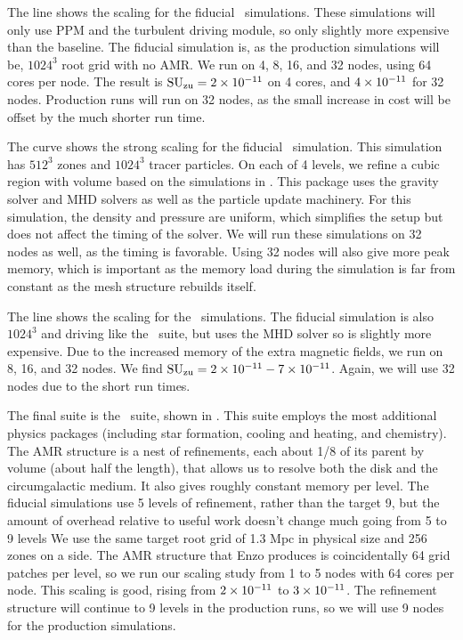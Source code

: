\documentclass[11pt]{NSF}  %
\begin{document}
The  line shows the scaling for the fiducial \nameTurbulence\
simulations.  These simulations will only use PPM and the turbulent driving
module, so only slightly more expensive than the baseline.  The
fiducial simulation is, as the production simulations will be, $1024^3$ root
grid with no AMR.
 We run on 4, 8, 16, and 32 nodes, using 64 cores per node.  The result is
$\rm{SU}_{\rm{zu}}=2\times {10^{-11}}$ on 4 cores, and $4\times {10^{-11}}$ for 32 nodes.  Production runs
will run on 32
nodes, as the small increase in cost will be offset by the much shorter run
time.

The  curve shows the strong scaling for the fiducial \nameCores\
simulation.  This simulation has $512^3$ zones and $1024^3$ tracer particles.
On each of 4 levels, we refine a cubic region with volume based on the simulations
in \citep{Collins12}.  This package uses the gravity solver and MHD solvers as
well as the particle update machinery.
For this simulation, the density and pressure are uniform, which simplifies the
setup but does not affect the timing of the solver.  We will run these
simulations on 32 nodes as well, as the timing is favorable. 
Using 32 nodes will also give more peak memory, which is important as the memory
load during the simulation is far from constant as the mesh structure rebuilds
itself.

The  line shows the scaling for the \nameCMB\ simulations. The fiducial
simulation is also $1024^3$ and driving like the \nameTurbulence\ suite, but uses the MHD solver so is slightly more
expensive.  Due to the increased memory of the extra magnetic fields, we run on
8, 16, and 32 nodes.  We find $\rm{SU}_{\rm{zu}}=2\times {10^{-11}}-7\times {10^{-11}}$.  
Again, we will use 32 nodes due to the short run times.

The final suite is the \nameGalaxies\ suite, shown in .  This suite
employs the most additional physics packages (including star formation,
cooling and heating, and chemistry).  The AMR structure
 is a nest of refinements, each about 1/8 of its
parent by volume (about half the length), that allows us to resolve both the disk and the circumgalactic medium.
It also gives roughly constant memory per level.
The fiducial simulations use 5 levels of refinement, rather than the target
9, but the amount of overhead relative to useful work doesn't change much going
from 5 to 9 levels  We use the same target root grid of 1.3 Mpc in physical
size and 256 zones on a side.  The AMR structure that Enzo produces is coincidentally 64 grid
patches per level, so we run our scaling study from 1 to 5 nodes with 64 cores
per node.     
This scaling is good, rising from $2\times {10^{-11}}$ to $3\times {10^{-11}}$. The refinement
structure will continue to 9 levels in the production runs, so we will use 9
nodes for the production simulations.
\end{document}
